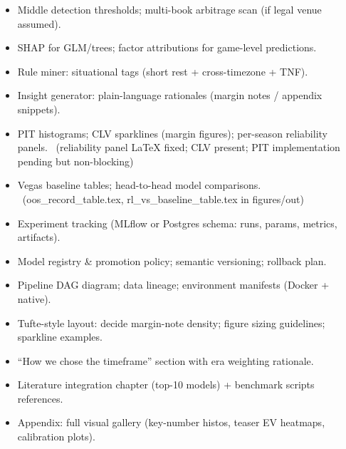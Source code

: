 \begin{itemize}
  \item {} Middle detection thresholds; multi-book arbitrage scan (if legal venue assumed).
\end{itemize}

\begin{itemize}
  \item {} SHAP for GLM/trees; factor attributions for game-level predictions.
  \item {} Rule miner: situational tags (short rest + cross-timezone + TNF).
  \item {} Insight generator: plain-language rationales (margin notes / appendix snippets).
\end{itemize}

\begin{itemize}
  \item {} PIT histograms; CLV sparklines (margin figures); per-season reliability panels. \done\ (reliability panel LaTeX fixed; CLV present; PIT implementation pending but non-blocking)
  \item {} Vegas baseline tables; head-to-head model comparisons. \done\ (oos\_record\_table.tex, rl\_vs\_baseline\_table.tex in figures/out)
\end{itemize}

\begin{itemize}
  \item {} Experiment tracking (MLflow or Postgres schema: runs, params, metrics, artifacts).
  \item {} Model registry \& promotion policy; semantic versioning; rollback plan.
  \item {} Pipeline DAG diagram; data lineage; environment manifests (Docker + native).
\end{itemize}

\begin{itemize}
  \item {} Tufte-style layout: decide margin-note density; figure sizing guidelines; sparkline examples.
  \item {} “How we chose the timeframe” section with era weighting rationale.
  \item {} Literature integration chapter (top-10 models) + benchmark scripts references.
  \item {} Appendix: full visual gallery (key-number histos, teaser EV heatmaps, calibration plots).
\end{itemize}

